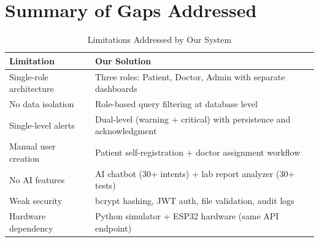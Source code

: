 \section{Summary of Gaps Addressed}
\begin{table}[H]
\centering
\caption{Limitations Addressed by Our System}
\label{tab:gaps}
\begin{tabular}{|p{5cm}|p{7cm}|}
\hline
\textbf{Limitation} & \textbf{Our Solution} \\
\hline
Single-role architecture & Three roles: Patient, Doctor, Admin with separate dashboards \\
\hline
No data isolation & Role-based query filtering at database level \\
\hline
Single-level alerts & Dual-level (warning + critical) with persistence and acknowledgment \\
\hline
Manual user creation & Patient self-registration + doctor assignment workflow \\
\hline
No AI features & AI chatbot (30+ intents) + lab report analyzer (30+ tests) \\
\hline
Weak security & bcrypt hashing, JWT auth, file validation, audit logs \\
\hline
Hardware dependency & Python simulator + ESP32 hardware (same API endpoint) \\
\hline
\end{tabular}
\end{table}

